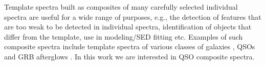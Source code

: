 \documentclass{aa}    %
\newcommand{\sectionname}{Sect.}
\newcommand{\Sect}[1]{\sectionname~\ref{sect:#1}}
\newcommand{\sect}[1]{\Sect{#1}}
\newcommand{\todo}[3]{{\color{#2}\emph{#1}: #3}}
\newcommand{\jstodo}[1]{\todo{TODO }{green}{#1}}
\newcommand{\qtodo}[1]{\todo{Question}{red}{#1}}
\begin{document}
%
%
%
%
%
%
%
%
%
%
%
%
%
%

Template spectra built as composites of many carefully selected individual spectra
are useful for a wide range of purposes, e.g., the detection
of features that are too weak to be detected in individual spectra,
identification of objects that differ from the template, use in modeling/SED fitting etc. Examples of such composite spectra include template spectra of various classes of galaxies \citep{Mannucci2001, Shapley2003, Dobos2012}, QSOs \citep{CristianiS.andVio1990, Boyle1990, Francis1991, Zheng1997, Brotherton2000, VandenBerk2001, Telfer2002, Richards2006a, Glikman2006, Lusso2015} and GRB afterglows \citep{Christensen2011}. In this work we are interested in QSO composite spectra.
\end{document}
